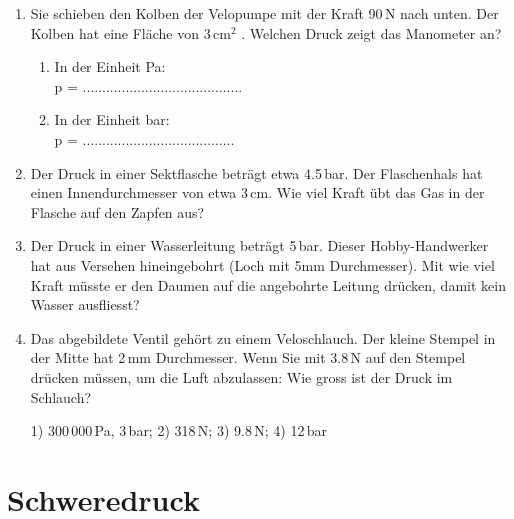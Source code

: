 \documentclass[11pt]{article}
\begin{document}
\begin{enumerate}
    \item Sie schieben den Kolben der Velopumpe mit der Kraft 90\,N nach unten. Der Kolben hat eine Fläche von 3\,cm$^2$ . Welchen Druck zeigt das Manometer an?

    \begin{enumerate}
        \item In der Einheit Pa:\\
        \vspace{0.2cm}
        p = .........................................
        \vspace{1.5cm}

        \item In der Einheit bar:\\

	       p = .......................................
        \vspace{1.5cm}

    \end{enumerate}

    \item Der Druck in einer Sektflasche beträgt etwa 4.5\,bar. Der Flaschenhals hat einen Innendurchmesser von etwa 3\,cm. Wie viel Kraft übt das Gas in der Flasche auf den Zapfen aus? \vspace{3cm}


    \item Der Druck in einer Wasserleitung beträgt 5\,bar. Dieser Hobby-Handwerker hat aus Versehen hineingebohrt (Loch mit 5mm Durchmesser). Mit wie viel Kraft müsste er den Daumen auf die angebohrte Leitung drücken, damit kein Wasser ausfliesst? \vspace{3cm}

    \item Das abgebildete Ventil gehört zu einem Veloschlauch. Der kleine Stempel in der Mitte hat 2\,mm Durchmesser. Wenn Sie mit 3.8\,N auf den Stempel drücken müssen, um die Luft abzulassen: Wie gross ist der Druck im Schlauch? %

    \vfill

    \hfill {\scriptsize 1) 300\,000\,Pa, 3\,bar;  2) 318\,N;    3) 9.8\,N;      4) 12\,bar }
\end{enumerate}

\newpage

\section*{Schweredruck}
\end{document}
